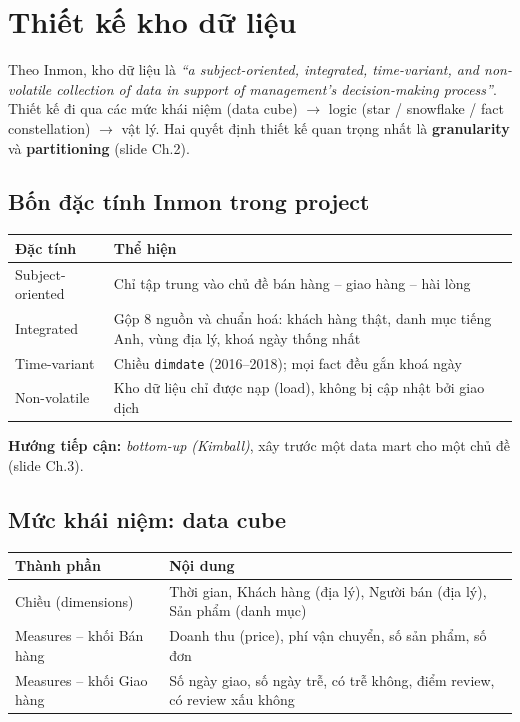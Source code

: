 \documentclass[12pt,a4paper]{report}
\newcommand{\code}[1]{\texttt{#1}}
\renewcommand{\_}{\oldunderscore\allowbreak}
\begin{document}
\chapter{Thiết kế kho dữ liệu}\label{ch:dw}

Theo Inmon, kho dữ liệu là \emph{``a subject-oriented, integrated, time-variant, and non-volatile collection of data in support of management's decision-making process''}. Thiết kế đi qua các mức khái niệm (data cube) $\rightarrow$ logic (star / snowflake / fact constellation) $\rightarrow$ vật lý. Hai quyết định thiết kế quan trọng nhất là \textbf{granularity} và \textbf{partitioning} (slide Ch.2).

\section{Bốn đặc tính Inmon trong project}

\begin{table}[H]
\centering
\begin{tabular}{L{3.5cm}L{11cm}}
\toprule
Đặc tính & Thể hiện \\
\midrule
Subject-oriented & Chỉ tập trung vào chủ đề bán hàng -- giao hàng -- hài lòng \\
Integrated & Gộp 8 nguồn và chuẩn hoá: khách hàng thật, danh mục tiếng Anh, vùng địa lý, khoá ngày thống nhất \\
Time-variant & Chiều \code{dim\_date} (2016--2018); mọi fact đều gắn khoá ngày \\
Non-volatile & Kho dữ liệu chỉ được nạp (load), không bị cập nhật bởi giao dịch \\
\bottomrule
\end{tabular}
\end{table}

\textbf{Hướng tiếp cận:} \emph{bottom-up (Kimball)}, xây trước một data mart cho một chủ đề (slide Ch.3).

\section{Mức khái niệm: data cube}

\begin{table}[H]
\centering
\begin{tabular}{L{4.2cm}L{10.3cm}}
\toprule
Thành phần & Nội dung \\
\midrule
Chiều (dimensions) & Thời gian, Khách hàng (địa lý), Người bán (địa lý), Sản phẩm (danh mục) \\
Measures -- khối Bán hàng & Doanh thu (price), phí vận chuyển, số sản phẩm, số đơn \\
Measures -- khối Giao hàng & Số ngày giao, số ngày trễ, có trễ không, điểm review, có review xấu không \\
\bottomrule
\end{tabular}
\end{table}
\end{document}
